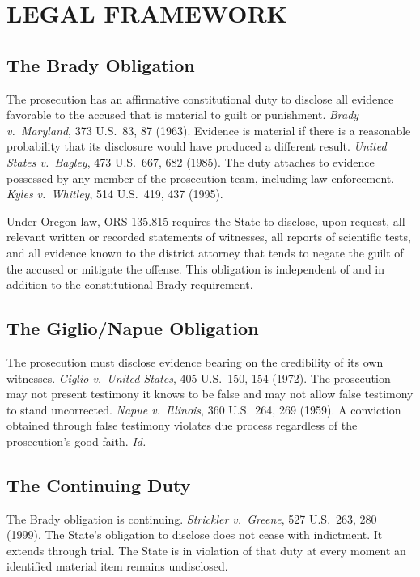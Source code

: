 \documentclass[12pt,letterpaper]{extarticle}
\begin{document}
	\section{LEGAL FRAMEWORK}
	
	\subsection{The Brady Obligation}
	
	The prosecution has an affirmative constitutional duty to disclose all evidence
	favorable to the accused that is material to guilt or punishment. \textit{Brady v.\
		Maryland}, 373 U.S.\ 83, 87 (1963). Evidence is material if there is a reasonable
	probability that its disclosure would have produced a different result. \textit{United
		States v.\ Bagley}, 473 U.S.\ 667, 682 (1985). The duty attaches to evidence
	possessed by any member of the prosecution team, including law enforcement.
	\textit{Kyles v.\ Whitley}, 514 U.S.\ 419, 437 (1995).
	
	Under Oregon law, ORS 135.815 requires the State to disclose, upon request, all
	relevant written or recorded statements of witnesses, all reports of scientific
	tests, and all evidence known to the district attorney that tends to negate the
	guilt of the accused or mitigate the offense. This obligation is independent of
	and in addition to the constitutional Brady requirement.
	
	\subsection{The Giglio/Napue Obligation}
	
	The prosecution must disclose evidence bearing on the credibility of its own
	witnesses. \textit{Giglio v.\ United States}, 405 U.S.\ 150, 154 (1972). The
	prosecution may not present testimony it knows to be false and may not allow false
	testimony to stand uncorrected. \textit{Napue v.\ Illinois}, 360 U.S.\ 264, 269
	(1959). A conviction obtained through false testimony violates due process
	regardless of the prosecution's good faith. \textit{Id.}
	
	\subsection{The Continuing Duty}
	
	The Brady obligation is continuing. \textit{Strickler v.\ Greene}, 527 U.S.\ 263,
	280 (1999). The State's obligation to disclose does not cease with indictment. It
	extends through trial. The State is in violation of that duty at every moment an
	identified material item remains undisclosed.
	
\end{document}
